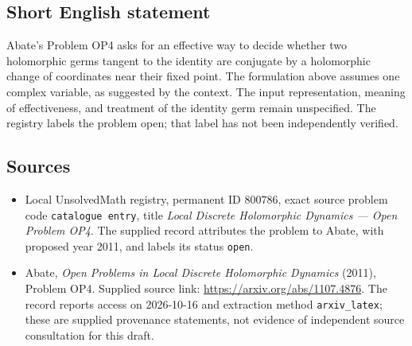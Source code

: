\documentclass[11pt]{article}
\begin{document}
\subsection{Short English statement}
Abate's Problem OP4 asks for an effective way to decide whether two holomorphic germs tangent to the identity are conjugate by a holomorphic change of coordinates near their fixed point. The formulation above assumes one complex variable, as suggested by the context. The input representation, meaning of effectiveness, and treatment of the identity germ remain unspecified. The registry labels the problem open; that label has not been independently verified.
\subsection{Sources}
\begin{itemize}
\item Local UnsolvedMath registry, permanent ID \(800786\), exact source problem code \texttt{catalogue entry}, title \emph{Local Discrete Holomorphic Dynamics --- Open Problem OP4}. The supplied record attributes the problem to Abate, with proposed year 2011, and labels its status \texttt{open}.
\item Abate, \emph{Open Problems in Local Discrete Holomorphic Dynamics} (2011), Problem OP4. Supplied source link: \url{https://arxiv.org/abs/1107.4876}. The record reports access on 2026-10-16 and extraction method \texttt{arxiv\_latex}; these are supplied provenance statements, not evidence of independent source consultation for this draft.
\end{itemize}
\end{document}
